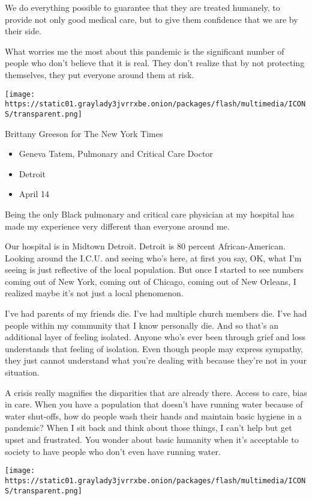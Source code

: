 We do everything possible to guarantee that they are treated humanely,
to provide not only good medical care, but to give them confidence that
we are by their side.

What worries me the most about this pandemic is the significant number
of people who don't believe that it is real. They don't realize that by
not protecting themselves, they put everyone around them at risk.

\texttt{[image: https://static01.graylady3jvrrxbe.onion/packages/flash/multimedia/ICONS/transparent.png]}

Brittany Greeson for The New York Times

\begin{itemize}
\tightlist
\item
  Geneva Tatem, Pulmonary and Critical Care Doctor
\item
  Detroit
\item
  April 14
\end{itemize}

Being the only Black pulmonary and critical care physician at my
hospital has made my experience very different than everyone around me.

Our hospital is in Midtown Detroit. Detroit is 80 percent
African-American. Looking around the I.C.U. and seeing who's here, at
first you say, OK, what I'm seeing is just reflective of the local
population. But once I started to see numbers coming out of New York,
coming out of Chicago, coming out of New Orleans, I realized maybe it's
not just a local phenomenon.

I've had parents of my friends die. I've had multiple church members
die. I've had people within my community that I know personally die. And
so that's an additional layer of feeling isolated. Anyone who's ever
been through grief and loss understands that feeling of isolation. Even
though people may express sympathy, they just cannot understand what
you're dealing with because they're not in your situation.

A crisis really magnifies the disparities that are already there. Access
to care, bias in care. When you have a population that doesn't have
running water because of water shut-offs, how do people wash their hands
and maintain basic hygiene in a pandemic? When I sit back and think
about those things, I can't help but get upset and frustrated. You
wonder about basic humanity when it's acceptable to society to have
people who don't even have running water.

\texttt{[image: https://static01.graylady3jvrrxbe.onion/packages/flash/multimedia/ICONS/transparent.png]}

